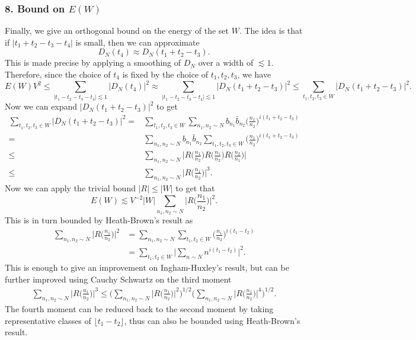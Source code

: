 \subsubsection*{8. Bound on $E(W)$}
Finally, we give an orthogonal bound on the energy of the set $W$. The idea is that if $|t_1+t_2-t_3-t_4|$ is small, then we can approximate \[
D_N(t_4) \approx D_N(t_1+t_2-t_3).
\]
This is made precise by applying a smoothing of $D_N$ over a width of $\lesssim 1$.
Therefore, since the choice of $t_4$ is fixed by the choice of $t_1,t_2,t_3$, we have\[
E(W)V^2\leq \sum_{|t_1-t_2-t_3-t_4|\lesssim 1} |D_N(t_4)|^2 \approx \sum_{|t_1-t_2-t_3-t_4|\lesssim 1} |D_N(t_1+t_2-t_3)|^2 \leq \sum_{t_1,t_2,t_3\in W} |D_N(t_1+t_2-t_3)|^2.
\]
Now we can expand $|D_N(t_1+t_2-t_3)|^2$ to get \begin{align*}
    \sum_{t_1,t_2,t_3\in W} |D_N(t_1+t_2-t_3)|^2=& \sum_{t_1,t_2,t_3\in W}\sum_{n_1,n_2\sim N} b_{n_1} \bar{b}_{n_2} \Big(\frac{n_1}{n_2}\Big)^{i(t_1+t_2-t_3)}\\ 
    =&\sum_{n_1,n_2\sim N} b_{n_1} \bar{b}_{n_2}\sum_{t_1,t_2,t_3\in W}\Big(\frac{n_1}{n_2}\Big)^{i(t_1+t_2-t_3)}\\ 
    \leq& \sum_{n_1,n_2\sim N} \Big|R\Big(\frac{n_1}{n_2}\Big)R\Big(\frac{n_1}{n_2}\Big)R\Big(\frac{n_2}{n_1}\Big)\Big|\\ 
    \leq& \sum_{n_1,n_2\sim N} \Big|R\Big(\frac{n_1}{n_2}\Big)\Big|^3.
\end{align*}
Now we can apply the trivial bound $|R|\leq |W|$ to get that \[
    E(W)\lesssim V^{-2}|W|\sum_{n_1,n_2\sim N} \Big|R\Big(\frac{n_1}{n_2}\Big)\Big|^2.
\]
This is in turn bounded by Heath-Brown's result as \begin{align*}
    \sum_{n_1,n_2\sim N} \Big|R\Big(\frac{n_1}{n_2}\Big)\Big|^2 &=
    \sum_{n_1,n_2\sim N}\sum_{t_1,t_2\in W} \Big(\frac{n_1}{n_2}\Big)^{i(t_1-t_2)}\\ 
    &= \sum_{t_1,t_2\in W} \Big|\sum_{n\sim N} n^{i(t_1-t_2)} \Big|^2.
\end{align*}
This is enough to give an improvement on Ingham-Huxley's result, but can be further improved using Cauchy Schwartz on the third moment \begin{align*}
    \sum_{n_1,n_2\sim N} \Big|R\Big(\frac{n_1}{n_2}\Big)\Big|^3 \leq 
    \Bigg(\sum_{n_1,n_2\sim N} \Big|R\Big(\frac{n_1}{n_2}\Big)\Big|^2 \Bigg)^{1/2} \Bigg(\sum_{n_1,n_2\sim N} \Big|R\Big(\frac{n_1}{n_2}\Big)\Big|^4\Bigg)^{1/2}.
\end{align*}
The fourth moment can be reduced back to the second moment by taking representative classes of $\lfloor t_1-t_2 \rfloor$, thus can also be bounded using Heath-Brown's result.